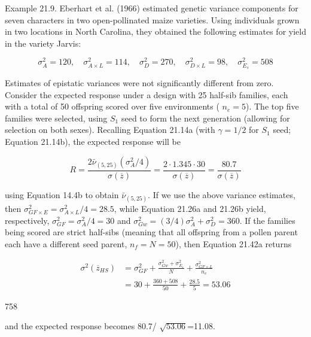 \documentclass{article}
\begin{document}
Example 21.9. Eberhart et al. (1966) estimated genetic variance components for seven characters in two open-pollinated maize varieties. Using individuals grown in two locations in North Carolina, they obtained the following estimates for yield in the variety Jarvis:

\begin{equation}
\sigma_{A}^{2}=120,\quad\sigma_{A\times L}^{2}=114,\quad\sigma_{D}^{2}=270,\quad\sigma_{D\times L}^{2}=98,\quad\sigma_{E_{s}}^{2}=508
\end{equation}

Estimates of epistatic variances were not significantly different from zero. Consider the expected response under a design with 25 half-sib families, each with a total of 50 offspring scored over five environments ( $ n_e = 5 $). The top five families were selected, using  $ S_1 $ seed to form the next generation (allowing for selection on both sexes). Recalling Equation 21.14a (with  $ \gamma = 1/2 $ for  $ S_1 $ seed; Equation 21.14b), the expected response will be

\begin{equation}
R=\frac{2\bar{\nu}_{(5,25)}\left(\sigma_{A}^{2}/4\right)}{\sigma\left(\overline{z}\right)}=\frac{2\cdot1.345\cdot30}{\sigma\left(\overline{z}\right)}=\frac{80.7}{\sigma\left(\overline{z}\right)}
\end{equation}

using Equation 14.4b to obtain  $ \bar{\nu}_{(5,25)} $. If we use the above variance estimates, then  $ \sigma_{GF \times E}^2 = \sigma_{A \times L}^2 / 4 = 28.5 $, while Equation 21.26a and 21.26b yield, respectively,  $ \sigma_{GF}^2 = \sigma_A^2 / 4 = 30 $ and  $ \sigma_{Gw}^2 = (3 / 4) \sigma_A^2 + \sigma_D^2 = 360 $. If the families being scored are strict half-sibs (meaning that all offspring from a pollen parent each have a different seed parent,  $ n_f = N = 50 $), then Equation 21.42a returns

\begin{equation}
\begin{aligned}\sigma^{2}(\overline{z}_{HS})&=\sigma_{GF}^{2}+\frac{\sigma_{Gw}^{2}+\sigma_{E_{s}}^{2}}{N}+\frac{\sigma_{GF\times L}^{2}}{n_{e}}\\&=30+\frac{360+508}{50}+\frac{28.5}{5}=53.06\end{aligned}
\end{equation}

758

and the expected response becomes 80.7/ $ \sqrt{53.06} $=11.08.
\end{document}
